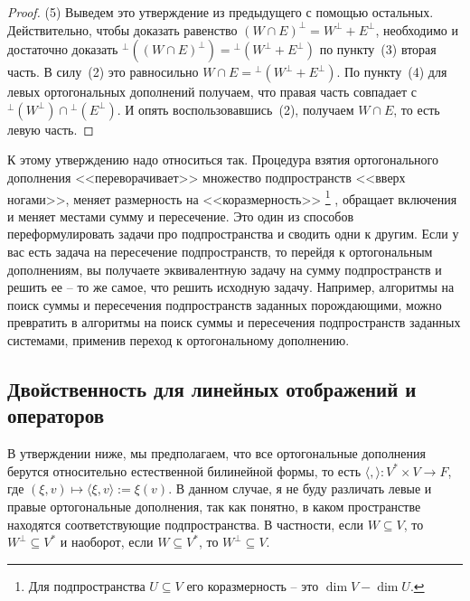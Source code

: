\begin{proof}
(5) Выведем это утверждение из предыдущего с помощью остальных.
Действительно, чтобы доказать равенство $(W\cap E)^\bot = W^\bot + E^\bot$, необходимо и достаточно доказать ${}^\bot((W\cap E)^\bot) = {}^\bot(W^\bot + E^\bot)$ по пункту~(3) вторая часть.
В силу~(2) это равносильно $W\cap E = {}^\bot(W^\bot+E^\bot)$.
По пункту~(4) для левых ортогональных дополнений получаем, что правая часть совпадает с ${}^\bot(W^\bot) \cap {}^\bot(E^\bot)$.
И опять воспользовавшись~(2), получаем $W\cap E$, то есть левую часть.
\end{proof}

К этому утверждению надо относиться так.
Процедура взятия ортогонального дополнения <<переворачивает>> множество подпространств <<вверх ногами>>, меняет размерность на <<коразмерность>>%
\footnote{Для подпространства $U\subseteq V$ его коразмерность -- это $\dim V - \dim U$.}%
, обращает включения и меняет местами сумму и пересечение.
Это один из способов переформулировать задачи про подпространства и сводить одни к другим.
Если у вас есть задача на пересечение подпространств, то перейдя к ортогональным дополнениям, вы получаете эквивалентную задачу на сумму подпространств и решить ее -- то же самое, что решить исходную задачу.
Например, алгоритмы на поиск суммы и пересечения подпространств заданных порождающими, можно превратить в алгоритмы на поиск суммы и пересечения подпространств заданных системами, применив переход к ортогональному дополнению.


\subsection{Двойственность для линейных отображений и операторов}

В утверждении ниже, мы предполагаем, что все ортогональные дополнения берутся относительно естественной билинейной формы, то есть $\langle, \rangle\colon V^*\times V\to F$, где $(\xi, v)\mapsto \langle \xi, v\rangle := \xi(v)$.
В данном случае, я не буду различать левые и правые ортогональные дополнения, так как понятно, в каком пространстве находятся соответствующие подпространства.
В частности, если $W\subseteq V$, то $W^\bot\subseteq V^*$ и наоборот, если $W\subseteq V^*$, то $W^\bot \subseteq V$.

